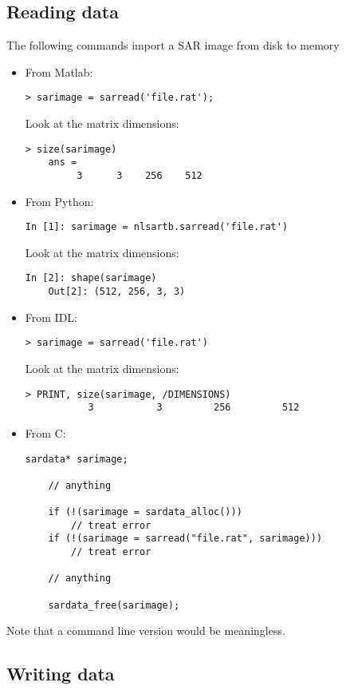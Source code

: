 \documentclass[10pt,french,english,a4paper]{article}
\begin{document}
\subsection{Reading data}

The following commands import a SAR image from disk to memory
\begin{itemize}
\item From Matlab:
  \begin{Verbatim}[frame=single]
    > sarimage = sarread('file.rat');
  \end{Verbatim}
  Look at the matrix dimensions:
  \begin{Verbatim}[frame=single]
    > size(sarimage)
    ans =
         3      3    256    512
  \end{Verbatim}
\item From Python:
  \begin{Verbatim}[frame=single]
    In [1]: sarimage = nlsartb.sarread('file.rat')

  \end{Verbatim}
  Look at the matrix dimensions:
  \begin{Verbatim}[frame=single]
    In [2]: shape(sarimage)
    Out[2]: (512, 256, 3, 3)
  \end{Verbatim}
\item From IDL:
  \begin{Verbatim}[frame=single]
    > sarimage = sarread('file.rat')
  \end{Verbatim}
  Look at the matrix dimensions:
  \begin{Verbatim}[frame=single]
    > PRINT, size(sarimage, /DIMENSIONS)
           3           3         256         512
  \end{Verbatim}
\item From C:
  \begin{Verbatim}[frame=single]
    sardata* sarimage;

    // anything

    if (!(sarimage = sardata_alloc()))
        // treat error
    if (!(sarimage = sarread("file.rat", sarimage)))
        // treat error

    // anything

    sardata_free(sarimage);
  \end{Verbatim}
\end{itemize}

Note that a command line version would be meaningless.

\subsection{Writing data}
\end{document}

